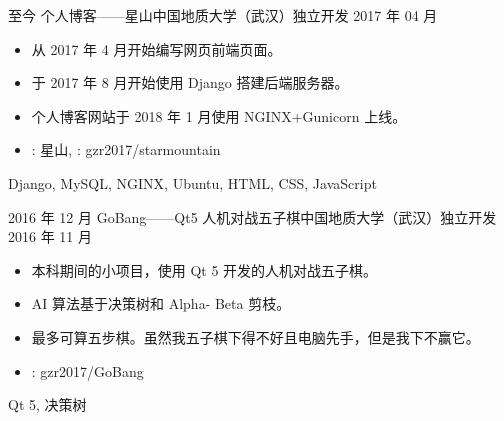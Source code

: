 \begin{experiences}
  \experience
  {至今} {个人博客——星山}{中国地质大学（武汉）}{独立开发}
  {2017 年 04 月}    {
    \begin{itemize}
      \item  从 2017 年 4 月开始编写网页前端页面。
      \item 于 2017 年 8 月开始使用 Django 搭建后端服务器。
      \item 个人博客网站于 2018 年 1 月使用 NGINX+Gunicorn 上线。
      \item \faLink:  {星山}, \faGithub:  {gzr2017/starmountain}
    \end{itemize}
  }
  {Django, MySQL, NGINX, Ubuntu, HTML, CSS, JavaScript}
  \emptySeparator

  \experience
  {2016 年 12 月} {GoBang——Qt5 人机对战五子棋}{中国地质大学（武汉）}{独立开发}
  {2016 年 11 月}    {
    \begin{itemize}
      \item  本科期间的小项目，使用 Qt 5 开发的人机对战五子棋。
      \item AI 算法基于决策树和 Alpha- Beta 剪枝。
      \item  最多可算五步棋。虽然我五子棋下得不好且电脑先手，但是我下不赢它。
      \item \faGithub:  {gzr2017/GoBang}
    \end{itemize}
  }
  {Qt 5, 决策树}
  \emptySeparator
\end{experiences}
